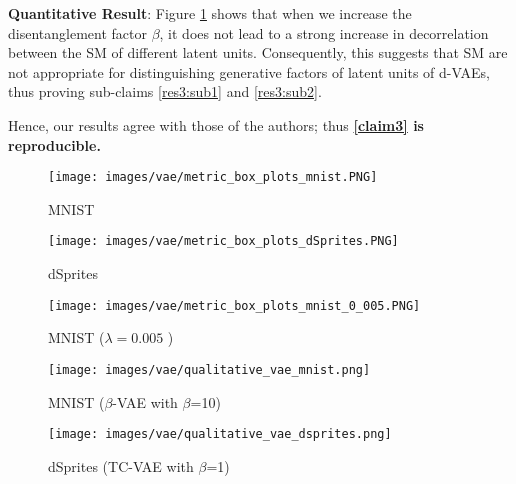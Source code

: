 \textbf{Quantitative Result}: Figure \ref{fig:mnistvaebox}  shows that when we increase the disentanglement factor $\beta$, it does not lead to a strong increase in decorrelation between the SM of different latent units. Consequently, this suggests that SM are not appropriate for distinguishing generative factors of latent units of d-VAEs, thus proving sub-claims \ref{res3:sub1} and \ref{res3:sub2}.

Hence, our results agree with those of the authors; thus \textbf{\ref{claim3} is reproducible.}

\begin{figure*}[b!]
\centering
\begin{subfigure}[b]{0.32\linewidth}
\texttt{[image: images/vae/metric\_box\_plots\_mnist.PNG]}
\caption{MNIST}\label{fig:mnistvaebox}
\end{subfigure}
\begin{subfigure}[b]{0.32\linewidth}
\texttt{[image: images/vae/metric\_box\_plots\_dSprites.PNG]} 
\caption{dSprites}\label{fig:dspritesvaebox}
\end{subfigure}
\begin{subfigure}[b]{0.32\linewidth}
\texttt{[image: images/vae/metric\_box\_plots\_mnist\_0\_005.PNG]}
\caption{MNIST ($\lambda= 0.005$ )}\label{fig:mnistvaeboxattrpr}
\end{subfigure}
\caption{PCC over pairs of saliency maps (Gradient Shap) from each combination of a model's latent unit for different values of β. Figure \ref{fig:mnistvaeboxattrpr} uses attribution priors as explained in Section \ref{sec:expsetup}. }\label{fig:vaeboxes}
\end{figure*}


\begin{figure*}[b!]
\centering
\begin{subfigure}[b]{0.35\linewidth}
\texttt{[image: images/vae/qualitative\_vae\_mnist.png]}
\caption{MNIST ($\beta$-VAE with $\beta$=10)}\label{fig:qualitativevaemnist}
\end{subfigure}
\begin{subfigure}[b]{0.60\linewidth}
\texttt{[image: images/vae/qualitative\_vae\_dsprites.png]} 
\caption{dSprites (TC-VAE with $\beta$=1)}\label{fig:qualitativevaedsprites}
\end{subfigure}
\caption{Saliency maps for each latent unit of the disentangled VAEs. The VAES selected were the ones with the lowest PCC. $i^{th}$ saliency dimension highlights latent unit $i$.} 
\end{figure*}


